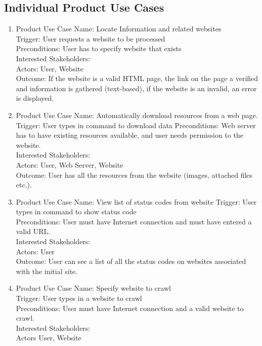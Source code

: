 \documentclass[12pt]{article}
\begin{document}
\subsection{Individual Product Use Cases  }
\begin{enumerate}
  \item  Product Use Case Name: Locate Information and related websites \\
  Trigger: User requests a website to be processed \\
Preconditions: User has to specify website that exists\\
Interested Stakeholders: \\
Actors: User, Website\\
Outcome: If the website is a valid HTML page, the link on the page a verified and information is gathered (text-based), if the website is an invalid, an error is displayed.\\
  \item Product Use Case Name: Automatically download resources from a web page.\\
  Trigger: User types in command to download data
Preconditions: Web server has to have existing resources available, and user needs permission to the website.\\
Interested Stakeholders: \\
Actors: User, Web Server, Website\\
Outcome: User has all the resources from the website (images, attached files etc.).\\
  \item Product Use Case Name: View list of status codes from website
  Trigger: User types in command to show status code\\
Preconditions: User must have Internet connection and must have entered a valid URL.\\
Interested Stakeholders: \\
Actors: User\\
Outcome: User can see a list of all the status codes on websites associated with the initial site.\\
  \item Product Use Case Name: Specify website to crawl\\
Trigger: User types in a website to crawl\\
Preconditions: User must have Internet connection and a valid website to crawl.\\
Interested Stakeholders:\\
Actors User, Website\\

\end{enumerate}
\end{document}
